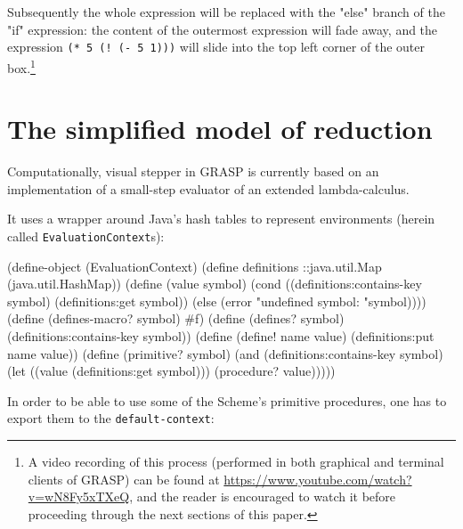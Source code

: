 \documentclass[acmsmall]{acmart}
\newenvironment{Snippet}{\Verbatim[samepage=true]}{\endVerbatim}
\begin{document}
Subsequently the whole expression will be replaced with the "else"
branch of the "if" expression: the content of the outermost expression
will fade away, and the expression \texttt{(* 5 (! (- 5 1)))} will
slide into the top left corner of the outer box.\footnote{A video
recording of this process (performed in both graphical and terminal
clients of GRASP) can be found at
\url{https://www.youtube.com/watch?v=wN8Fy5xTXeQ}, and the reader is
encouraged to watch it before proceeding through the next sections of
this paper.}

\section{The simplified model of reduction}

Computationally, visual stepper in GRASP is currently based on an
implementation of a small-step evaluator of an extended
lambda-calculus.

It uses a wrapper around Java's hash tables to represent
environments (herein called \texttt{Evalu\-ation\-Con\-text}s):

\begin{Snippet}
(define-object (EvaluationContext)
\end{Snippet}
\begin{Snippet}
  (define definitions ::java.util.Map
    (java.util.HashMap))
\end{Snippet}
\begin{Snippet}
  (define (value symbol)
    (cond ((definitions:contains-key symbol)
	   (definitions:get symbol))
	  (else
	   (error "undefined symbol: "symbol))))
\end{Snippet}
\begin{Snippet}
  (define (defines-macro? symbol)
    #f)
\end{Snippet}
\begin{Snippet}
  (define (defines? symbol)
    (definitions:contains-key symbol))
\end{Snippet}
\begin{Snippet}
  (define (define! name value)
    (definitions:put name value))
\end{Snippet}
\begin{Snippet}
  (define (primitive? symbol)
    (and (definitions:contains-key symbol)
	 (let ((value (definitions:get symbol)))
	   (procedure? value)))))
\end{Snippet}

In order to be able to use some of the Scheme's primitive
procedures, one has to export them to the \texttt{default-context}:
\end{document}

